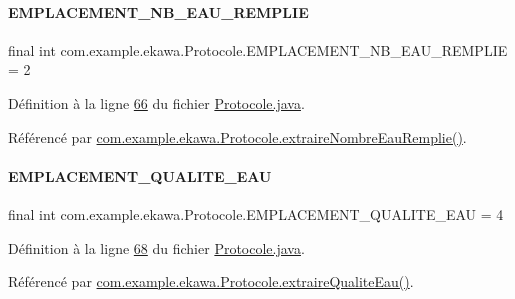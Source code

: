 \paragraph{\texorpdfstring{E\+M\+P\+L\+A\+C\+E\+M\+E\+N\+T\+\_\+\+N\+B\+\_\+\+E\+A\+U\+\_\+\+R\+E\+M\+P\+L\+IE}{EMPLACEMENT\_NB\_EAU\_REMPLIE}}
{\footnotesize\ttfamily final int com.\+example.\+ekawa.\+Protocole.\+E\+M\+P\+L\+A\+C\+E\+M\+E\+N\+T\+\_\+\+N\+B\+\_\+\+E\+A\+U\+\_\+\+R\+E\+M\+P\+L\+IE = 2\hspace{0.3cm}{\ttfamily [static]}}



Définition à la ligne \hyperlink{_protocole_8java_source_l00066}{66} du fichier \hyperlink{_protocole_8java_source}{Protocole.\+java}.



Référencé par \hyperlink{_protocole_8java_source_l00377}{com.\+example.\+ekawa.\+Protocole.\+extraire\+Nombre\+Eau\+Remplie()}.

\mbox{\label{classcom_1_1example_1_1ekawa_1_1_protocole_aeb21f04096c5f1220c172bfdfbdd5dae}} 
\paragraph{\texorpdfstring{E\+M\+P\+L\+A\+C\+E\+M\+E\+N\+T\+\_\+\+Q\+U\+A\+L\+I\+T\+E\+\_\+\+E\+AU}{EMPLACEMENT\_QUALITE\_EAU}}
{\footnotesize\ttfamily final int com.\+example.\+ekawa.\+Protocole.\+E\+M\+P\+L\+A\+C\+E\+M\+E\+N\+T\+\_\+\+Q\+U\+A\+L\+I\+T\+E\+\_\+\+E\+AU = 4\hspace{0.3cm}{\ttfamily [static]}}



Définition à la ligne \hyperlink{_protocole_8java_source_l00068}{68} du fichier \hyperlink{_protocole_8java_source}{Protocole.\+java}.



Référencé par \hyperlink{_protocole_8java_source_l00411}{com.\+example.\+ekawa.\+Protocole.\+extraire\+Qualite\+Eau()}.

